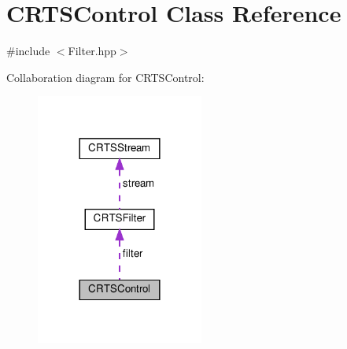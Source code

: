 \hypertarget{classCRTSControl}{}\section{C\+R\+T\+S\+Control Class Reference}
\label{classCRTSControl}


{\ttfamily \#include $<$Filter.\+hpp$>$}



Collaboration diagram for C\+R\+T\+S\+Control\+:
\nopagebreak
\begin{figure}[H]
\begin{center}
\leavevmode
\includegraphics[width=156pt]{classCRTSControl__coll__graph}
\end{center}
\end{figure}
